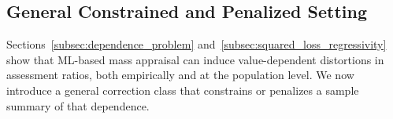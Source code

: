 \documentclass{article}
\theoremstyle{plain}
\theoremstyle{definition}
\newcommand{\1}{\mathbf{1}}
\newcommand{\Cov}{\text{Cov}}
\begin{document}






\subsection{General Constrained and Penalized Setting}
\label{subsec:general_penalized_setting}

Sections~\ref{subsec:dependence_problem} and~\ref{subsec:squared_loss_regressivity} show that ML-based mass appraisal can induce value-dependent distortions in assessment ratios, both empirically and at the population level. We now introduce a general correction class that constrains or penalizes a sample summary of that dependence.
\end{document}
